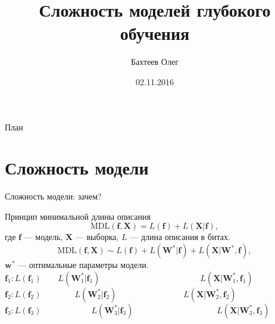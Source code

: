 \documentclass[10pt,pdf,utf8,russian,aspectratio=169]{beamer}
\title[Сложность модели]{Сложность моделей глубокого обучения}
\author{Бахтеев Олег}
\institute{МФТИ}
\date{02.11.2016}
\begin{document}
\begin{frame}
  \titlepage
\end{frame}

\begin{frame}{План}
  \tableofcontents
\end{frame}

\section{Сложность модели}
\begin{frame}{Сложность модели: зачем?}
\begin{figure}
  \centering
\label{fig:1}\qquad

\end{figure}


\end{frame}


\begin{frame}{Принцип минимальной длины описания}
\[
\text{MDL}(\mathbf{f}, \mathbf{X}) = L(\mathbf{f}) + L(\mathbf{X}|\mathbf{f}),
\]
где $\mathbf{f}$ --- модель, $\mathbf{X}$ --- выборка, $L$ --- длина описания в битах.
\\
\[
\text{MDL}(\mathbf{f}, \mathbf{X}) \sim L(\mathbf{f}) + L(\mathbf{W}^*| \mathbf{f}) + L(\mathbf{X}|\mathbf{W}^*, \mathbf{f}),
\]
$\mathbf{w}^*$ --- оптимальные параметры модели.\\


$\mathbf{f}_1: L(\mathbf{f}_1)\qquad L(\mathbf{W}_1^*| \mathbf{f}_1) \qquad \qquad \qquad \qquad \qquad	\qquad L(\mathbf{X}|\mathbf{W}_1^*, \mathbf{f}_1) $\\
$\mathbf{f}_2: L(\mathbf{f}_2)\qquad \qquad L(\mathbf{W}_2^*| \mathbf{f}_2) \qquad \qquad \qquad \qquad L(\mathbf{X}|\mathbf{W}_2^*, \mathbf{f}_2) $\\
$\mathbf{f}_3: L(\mathbf{f}_3)\qquad \qquad \qquad L(\mathbf{W}_3^*| \mathbf{f}_3) \qquad \qquad \qquad \qquad \qquad L(\mathbf{X}|\mathbf{W}_3^*, \mathbf{f}_3) $

\end{frame}
\end{document}
